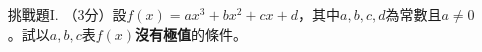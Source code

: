 \documentclass[12pt]{article}
\begin{document}
\begin{enumerate}
        \hrulefill

        \hrulefill

        \hrulefill

        \hrulefill

        \hrulefill

        \hrulefill

        \hrulefill

        \hrulefill

        \hrulefill

        \hrulefill

        \hrulefill

        \hrulefill

        \hrulefill

        \hrulefill

        \hrulefill

        \hrulefill

        \hrulefill

        \hrulefill

        \hrulefill

        \hrulefill

        \hrulefill

        \hrulefill

        \item[挑戰題I.] （3分）設$f(x)=ax^3+bx^2+cx+d$，其中$a,b,c,d$為常數且$a\neq 0$。試以$a,b,c$表$f(x)$\textbf{沒有極值}的條件。

        \hrulefill

        \hrulefill

        \hrulefill

        \hrulefill

        \hrulefill

        \hrulefill

        \hrulefill

        \hrulefill

        \hrulefill

        \hrulefill

        \hrulefill

        \hrulefill

        \hrulefill

        \hrulefill

        \hrulefill

        \hrulefill

        \hrulefill

        \hrulefill


\end{enumerate}
\end{document}
